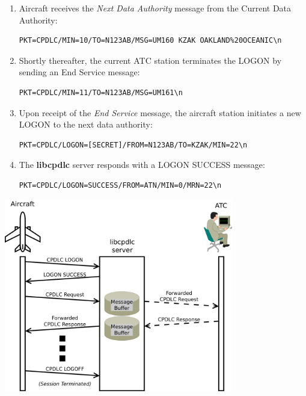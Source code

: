 \documentclass[a4paper,12pt]{article}
\newcommand{\libcpdlc}{\textbf{libcpdlc}\xspace}
\begin{document}
\begin{enumerate}

\item Aircraft receives the {\em Next Data Authority} message from the
Current Data Authority:

\begin{verbatim}
PKT=CPDLC/MIN=10/TO=N123AB/MSG=UM160 KZAK OAKLAND%20OCEANIC\n
\end{verbatim}

\item Shortly thereafter, the current ATC station terminates the LOGON by
sending an End Service message:

\begin{verbatim}
PKT=CPDLC/MIN=11/TO=N123AB/MSG=UM161\n
\end{verbatim}

\item Upon receipt of the {\em End Service} message, the aircraft station
initiates a new LOGON to the next data authority:

\begin{verbatim}
PKT=CPDLC/LOGON=[SECRET]/FROM=N123AB/TO=KZAK/MIN=22\n
\end{verbatim}

\item The \libcpdlc server responds with a LOGON SUCCESS message:

\begin{verbatim}
PKT=CPDLC/LOGON=SUCCESS/FROM=ATN/MIN=0/MRN=22\n
\end{verbatim}

\end{enumerate}

\begin{center}
\includegraphics[width=0.75\textwidth]{logon_flow.png}
\end{center}
\end{document}
